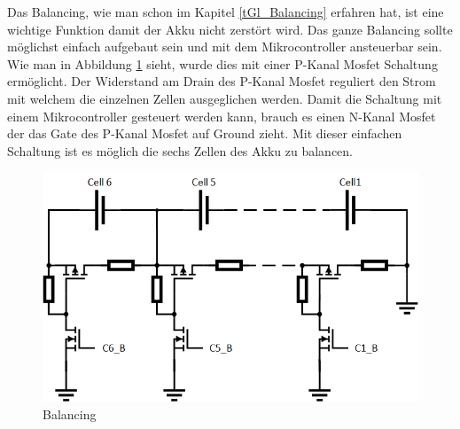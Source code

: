 Das Balancing, wie man schon im Kapitel \ref{tGl_Balancing} erfahren hat, ist eine wichtige Funktion damit der Akku nicht zerstört wird. Das ganze Balancing sollte möglichst einfach aufgebaut sein und mit dem Mikrocontroller ansteuerbar sein. Wie man in Abbildung \ref{fig:Balancing} sieht, wurde dies mit einer P-Kanal Mosfet Schaltung ermöglicht. Der Widerstand am Drain des P-Kanal Mosfet reguliert den Strom mit welchem die einzelnen Zellen ausgeglichen werden. Damit die Schaltung mit einem Mikrocontroller gesteuert werden kann, brauch es einen N-Kanal Mosfet der das Gate des P-Kanal Mosfet auf Ground zieht. Mit dieser einfachen Schaltung ist es möglich die sechs Zellen des Akku zu balancen.

\begin{figure} [H]
	\centering
	\includegraphics[width=0.6\linewidth]{images/Balancing}
	\caption{Balancing}
	\label{fig:Balancing}
\end{figure}


